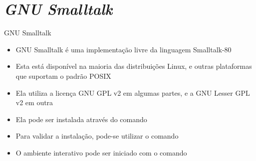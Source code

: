 \section{\it GNU Smalltalk}

\begin{frame}[fragile]{GNU Smalltalk}

    \begin{itemize}
        \item GNU Smalltalk é uma implementação livre da linguagem Smalltalk-80

        \item Esta está disponível na maioria das distribuições Linux, e outras plataformas
            que suportam o padrão POSIX

        \item Ela utiliza a licença GNU GPL v2 em algumas partes, e a GNU Lesser GPL v2 em outra

        \item Ela pode ser instalada através do comando


        \item Para validar a instalação, pode-se utilizar o comando


        \item O ambiente interativo pode ser iniciado com o comando

    \end{itemize}

\end{frame}

